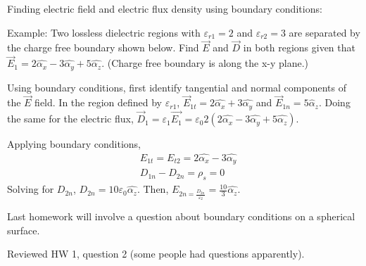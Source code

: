 \documentclass{article}
\begin{document}
Finding electric field and electric flux density using boundary conditions:

Example: Two lossless dielectric regions with \(\varepsilon_{r1} = 2\) and \(\varepsilon_{r2} = 3\) are separated by the charge free boundary shown below. Find \(\vec{E}\) and \(\vec{D}\) in both regions given that \(\vec{E}_1 = 2 \hat{\alpha_x} - 3 \hat{\alpha_y} + 5 \hat{\alpha_z}.\) (Charge free boundary is along the x-y plane.) 

Using boundary conditions, first identify tangential and normal components of the \(\vec{E}\) field. In the region defined by \(\varepsilon_{r1}\), \(\vec{E}_{1t} = 2 \hat{\alpha_x}+3 \hat{\alpha_y}\) and \(\vec{E}_{1n} = 5 \hat{\alpha}_z\). Doing the same for the electric flux, \(\vec{D}_1 = \varepsilon_1 \vec{E_1} = \varepsilon_0 2 (2 \hat{\alpha_x} - 3 \hat{\alpha_y} + 5 \hat{\alpha_z}).\)

Applying boundary conditions, 
\begin{align*}
	& E_{1t} = E_{t2} = 2 \hat{\alpha_x} - 3 \hat{\alpha_y} \\
	& D_{1n} - D_{2n} = \rho_s = 0 
\end{align*} 
Solving for \(D_{2n}\), \(D_{2n} = 10\varepsilon_0 \hat{\alpha_z}\).
Then, \(E_{2n = \frac{D_{2n}}{\varepsilon_2}} = \frac{10}{3}\hat{\alpha_z}\).

Last homework will involve a question about boundary conditions on a spherical surface.

Reviewed HW 1, question 2 (some people had questions apparently). 
\end{document}

